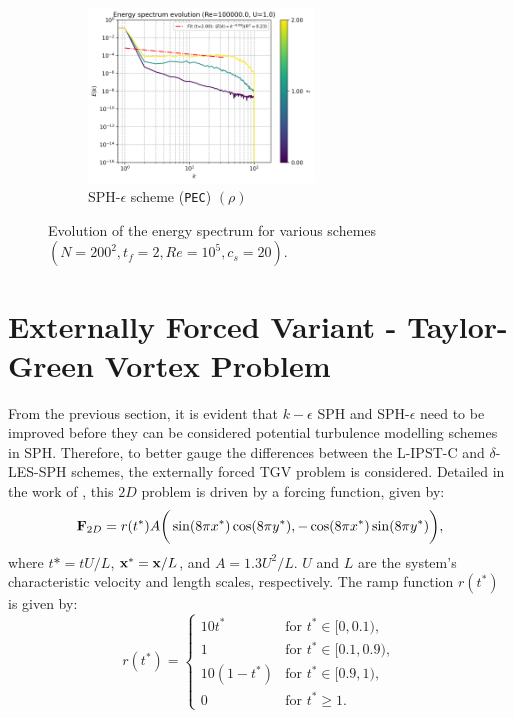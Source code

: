 \begin{figure}[htbp!]
\begin{subfigure}{7cm}
  \centering\includegraphics[width=6cm]{Code-Figures/long-tgv/c0_20_tait_hdx_2_pec_dtmul_1_mon2017_eps_0.5_no_n_o_files_50_nx_200_pst_10_re_100000_mon2017_tf_2/energy_spectrum_evolution_all.png}
  \caption{SPH-$\epsilon$ scheme (\texttt{PEC}) $(\rho)$}
  \end{subfigure}
  \caption{Evolution of the energy spectrum for various schemes $(N=200^2, t_f=2, Re=10^5, c_s=20)$.}
  \label{fig:ltgv-scheme-espec}
\end{figure}


\section{Externally Forced Variant - Taylor-Green Vortex Problem}

From the previous section, it is evident that $k-\epsilon$ SPH and SPH-$\epsilon$ need to be improved before they can be considered potential turbulence modelling schemes in SPH.
Therefore, to better gauge the differences between the L-IPST-C and $\delta$-LES-SPH schemes, the externally forced TGV problem is considered.
Detailed in the work of \cite{Antuono_Marrone_Di_Mascio_Colagrossi_2021}, this $2D$ problem is driven by a forcing function, given by:
\begin{equation}
  \mathbf{F}_{2D} = r(t^*) A \bigg( \sin(8\pi x^*) \cos(8\pi y^*), -\cos(8\pi x^*) \sin(8\pi y^*) \bigg),
\end{equation}
where $t*=tU/L$, $\mathbf{x}^* = \mathbf{x}/L$, and $A=1.3U^2/L$. $U$ and $L$ are the system's characteristic velocity and length scales, respectively.
The ramp function $r(t^*)$ is given by:
\begin{equation}
  r(t^*) = \begin{cases}
    10 t^* & \text{for } t^* \in [0, 0.1), \\
    1 & \text{for } t^* \in [0.1, 0.9), \\
    10 (1 - t^*) & \text{for } t^* \in [0.9, 1), \\
    0 & \text{for } t^* \geq 1.
  \end{cases}
\end{equation}


